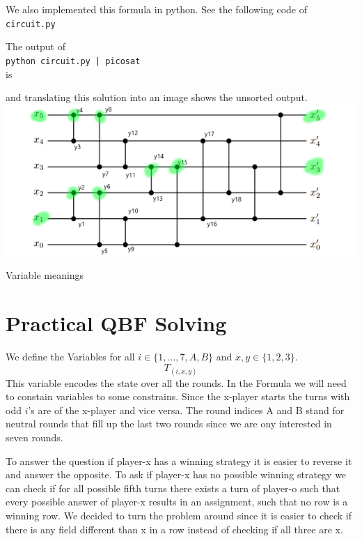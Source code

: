 \documentclass{base}
\begin{document}
We also implemented this formula in python.
See the following code of \verb|circuit.py|



The output of \\
\verb!python circuit.py | picosat! \\
is

and translating this solution into an image shows the unsorted output. \\
\includegraphics[scale=0.5]{sorting_network_sol.png}

Variable meanings












\clearpage
\section*{Practical QBF Solving}
We define the Variables for all $i \in \{1,\dots,7, A,B\}$ and $x,y \in \{1,2,3\}$.
$$T_{(i,x,y)}$$
This variable encodes the state over all the rounds.
In the Formula we will need to constain variables to some constrains.
Since the x-player starts the turns with odd $i$'s are of the x-player and vice versa.
The round indices A and B stand for neutral rounds that fill up the last two rounds since we are ony interested in seven rounds.


To answer the question if player-x has a winning strategy it is easier to reverse it and answer the opposite.
To ask if player-x has no possible winning strategy we can check if for all possible fifth turns there exists a turn of player-o such that every possible answer of player-x results in an assignment, such that no row is a winning row.
We decided to turn the problem around since it is easier to check if there is any field different than x in a row instead of checking if all three are x.
\end{document}
